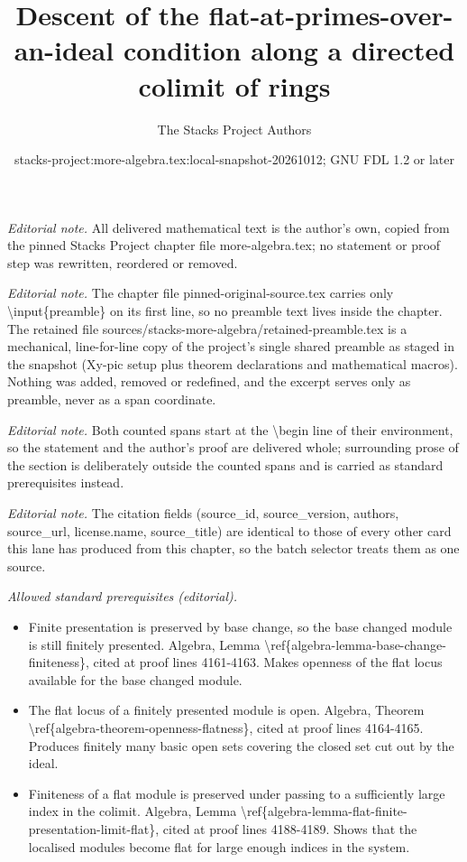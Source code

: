 \documentclass[10pt,a4paper]{amsart}
\title{Descent of the flat-at-primes-over-an-ideal condition along a directed colimit of rings}
\author{The Stacks Project Authors}
\date{stacks-project:more-algebra.tex:local-snapshot-20261012; GNU FDL 1.2 or later}
\theoremstyle{plain}
\theoremstyle{definition}
\theoremstyle{remark}
\numberwithin{equation}{subsection}
\begin{document}
\maketitle
\setcounter{subsection}{1}
\noindent\textit{Editorial note.} All delivered mathematical text is the author's own, copied from the pinned Stacks Project chapter file more-algebra.tex; no statement or proof step was rewritten, reordered or removed.\par\medskip
\noindent\textit{Editorial note.} The chapter file pinned-original-source.tex carries only \textbackslash{}input\{preamble\} on its first line, so no preamble text lives inside the chapter. The retained file sources/stacks-more-algebra/retained-preamble.tex is a mechanical, line-for-line copy of the project's single shared preamble as staged in the snapshot (Xy-pic setup plus theorem declarations and mathematical macros). Nothing was added, removed or redefined, and the excerpt serves only as preamble, never as a span coordinate.\par\medskip
\noindent\textit{Editorial note.} Both counted spans start at the \textbackslash{}begin line of their environment, so the statement and the author's proof are delivered whole; surrounding prose of the section is deliberately outside the counted spans and is carried as standard prerequisites instead.\par\medskip
\noindent\textit{Editorial note.} The citation fields (source\_id, source\_version, authors, source\_url, license.name, source\_title) are identical to those of every other card this lane has produced from this chapter, so the batch selector treats them as one source.\par\medskip
\noindent\textit{Allowed standard prerequisites (editorial).}\begin{itemize}
\item Finite presentation is preserved by base change, so the base changed module is still finitely presented. Algebra, Lemma \textbackslash{}ref\{algebra-lemma-base-change-finiteness\}, cited at proof lines 4161-4163. Makes openness of the flat locus available for the base changed module.
\item The flat locus of a finitely presented module is open. Algebra, Theorem \textbackslash{}ref\{algebra-theorem-openness-flatness\}, cited at proof lines 4164-4165. Produces finitely many basic open sets covering the closed set cut out by the ideal.
\item Finiteness of a flat module is preserved under passing to a sufficiently large index in the colimit. Algebra, Lemma \textbackslash{}ref\{algebra-lemma-flat-finite-presentation-limit-flat\}, cited at proof lines 4188-4189. Shows that the localised modules become flat for large enough indices in the system.
\end{itemize}\medskip
\end{document}
